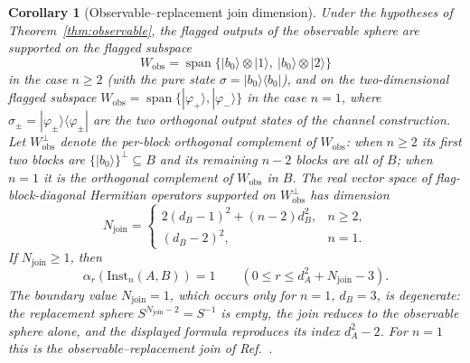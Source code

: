 \documentclass[11pt,a4paper]{article}
\newtheorem{corollary}[theorem]{Corollary}
\newcommand{\Inst}{\mathrm{Inst}}
\begin{document}
\begin{corollary}[Observable--replacement join dimension]
\label{cor:join-dimension}
Under the hypotheses of Theorem~\ref{thm:observable}, the flagged outputs of the observable sphere are supported on the flagged subspace
\[
W_{\mathrm{obs}}=\operatorname{span}\{|b_0\rangle\otimes|1\rangle,\ |b_0\rangle\otimes|2\rangle\}
\]
in the case $n\ge2$ (with the pure state $\sigma=|b_0\rangle\langle b_0|$), and on the two-dimensional flagged subspace $W_{\mathrm{obs}}=\operatorname{span}\{|\varphi_+\rangle,|\varphi_-\rangle\}$ in the case $n=1$, where $\sigma_\pm=|\varphi_\pm\rangle\langle\varphi_\pm|$ are the two orthogonal output states of the channel construction. Let $W_{\mathrm{obs}}^{\perp}$ denote the per-block orthogonal complement of $W_{\mathrm{obs}}$: when $n\ge2$ its first two blocks are $\{|b_0\rangle\}^{\perp}\subseteq B$ and its remaining $n-2$ blocks are all of $B$; when $n=1$ it is the orthogonal complement of $W_{\mathrm{obs}}$ in $B$. The real vector space of flag-block-diagonal Hermitian operators supported on $W_{\mathrm{obs}}^{\perp}$ has dimension
\[
N_{\mathrm{join}}=
\begin{cases}
2(d_B-1)^2+(n-2)d_B^2,&n\ge2,\\
(d_B-2)^2,&n=1.
\end{cases}
\]
If $N_{\mathrm{join}}\ge1$, then
\[
\alpha_r(\Inst_n(A,B))=1\qquad(0\le r\le d_A^2+N_{\mathrm{join}}-3).
\]
The boundary value $N_{\mathrm{join}}=1$, which occurs only for $n=1$, $d_B=3$, is degenerate: the replacement sphere $S^{N_{\mathrm{join}}-2}=S^{-1}$ is empty, the join reduces to the observable sphere alone, and the displayed formula reproduces its index $d_A^2-2$.
For $n=1$ this is the observable--replacement join of Ref.~\cite{CompanionChannels}.
\end{corollary}
\end{document}
